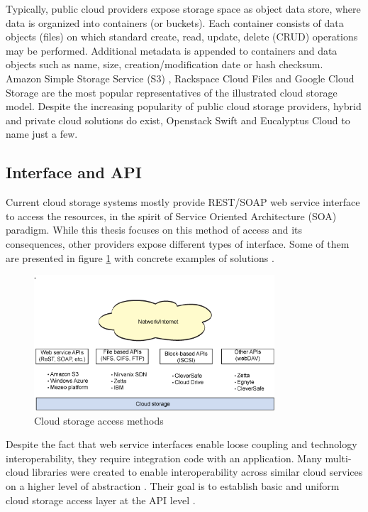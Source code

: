 Typically, public cloud providers expose storage space as object data store,
where data is organized into containers (or buckets). Each container consists
of data objects (files) on which standard create, read, update, delete (CRUD)
operations may be performed. Additional metadata is appended to containers and
data objects such as name, size, creation/modification date or hash checksum.\\

Amazon Simple Storage Service (S3) \cite{amazon-s3}, 
Rackspace Cloud Files \cite{rackspace-cloud} and
Google Cloud Storage \cite{google-cloud} are the most popular representatives
of the illustrated cloud storage model. Despite the increasing popularity of
public cloud storage providers, hybrid and private cloud solutions do exist,
Openstack Swift \cite{openstack-cloud} and 
Eucalyptus Cloud \cite{eucalyptus-cloud} to name just a few.\\

		\subsection{Interface and API}
Current cloud storage systems mostly provide REST/SOAP web service interface to
access the resources, in the spirit of Service Oriented Architecture (SOA)
paradigm. While this thesis focuses on this method of access and its
consequences, other providers expose different types of interface. Some of
them are presented in figure \ref{fig:cloud-access} with concrete examples of
solutions \cite{cloud-storage-anatomy}.

\begin{figure}[h!]
	\centering
	\includegraphics[width=0.8\textwidth]{images/cloud-access.png}
	\caption{Cloud storage access methods \cite{cloud-storage-anatomy}}
	\label{fig:cloud-access}
\end{figure}

Despite the fact that web service interfaces enable loose coupling and
technology interoperability, they require integration code with an application.
Many multi-cloud libraries were created to enable interoperability across
similar cloud services on a higher level of abstraction 
\cite{cloud-federation}. Their goal is to establish basic and uniform cloud
storage access layer at the API level \cite{jclouds, libcloud}.\\

